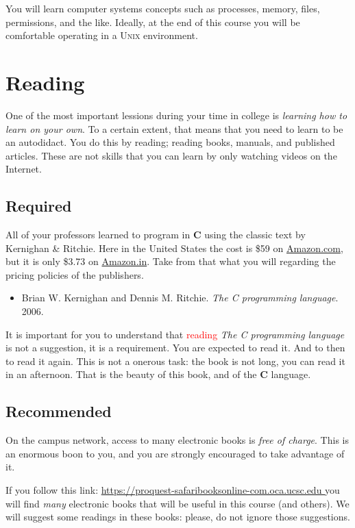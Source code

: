 \documentclass{article}
\begin{document}
You will learn computer systems concepts such as processes, memory, files,
permissions, and the like. Ideally, at the end of this course you will be
comfortable operating in a \textsc{Unix} environment.

\section{Reading}
One of the most important lessions during your time in college is
\emph{learning how to learn on your own}. To a certain extent, that
means that you need to learn to be an autodidact. You do this by
reading; reading books, manuals, and published articles. These are
not skills that you can learn by only watching videos on the Internet.

\subsection{Required}
All of your professors learned to program in \textbf{C} using the
classic text by Kernighan \& Ritchie.  Here in the United States
the cost is \$59 on \url{Amazon.com}, but it is only \$3.73 on
\url{Amazon.in}.  Take from that what you will regarding the pricing policies
of the publishers.

\begin{itemize}
\item
Brian W. Kernighan and Dennis M. Ritchie. \emph{The C programming language}. 2006.
\end{itemize}

It is important for you to understand that \textcolor{red}{reading}
\emph{The C programming
language} is not a suggestion, it is a requirement. You are expected
to read it. And to then to read it again.  This is not a onerous
task: the book is not long, you can read it in an afternoon. That
is the beauty of this book, and of the \textbf{C} language.

\subsection{Recommended}
On the campus network, access to many electronic books is \emph{free of
charge}. This is an enormous boon to you, and you are strongly encouraged to
take advantage of it.

If you follow this link:
\url{https://proquest-safaribooksonline-com.oca.ucsc.edu }
you will find \emph{many} electronic books that will be useful in
this course (and others). We will suggest some readings in these
books: please, do not ignore those suggestions.
\end{document}
